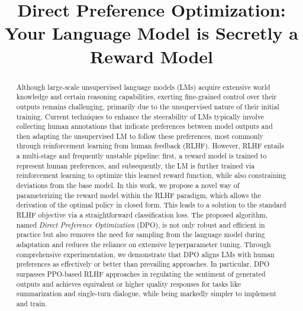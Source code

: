 \title{Direct Preference Optimization: Your Language Model is Secretly a Reward Model}

\begin{abstract}
Although large-scale unsupervised language models (LMs) acquire extensive world knowledge and certain reasoning capabilities, exerting fine-grained control over their outputs remains challenging, primarily due to the unsupervised nature of their initial training. Current techniques to enhance the steerability of LMs typically involve collecting human annotations that indicate preferences between model outputs and then adapting the unsupervised LM to follow these preferences, most commonly through reinforcement learning from human feedback (RLHF). However, RLHF entails a multi-stage and frequently unstable pipeline: first, a reward model is trained to represent human preferences, and subsequently, the LM is further trained via reinforcement learning to optimize this learned reward function, while also constraining deviations from the base model. In this work, we propose a novel way of parameterizing the reward model within the RLHF paradigm, which allows the derivation of the optimal policy in closed form. This leads to a solution to the standard RLHF objective via a straightforward classification loss. The proposed algorithm, named \textit{Direct Preference Optimization} (DPO), is not only robust and efficient in practice but also removes the need for sampling from the language model during adaptation and reduces the reliance on extensive hyperparameter tuning. Through comprehensive experimentation, we demonstrate that DPO aligns LMs with human preferences as effectively or better than prevailing approaches. In particular, DPO surpasses PPO-based RLHF approaches in regulating the sentiment of generated outputs and achieves equivalent or higher quality responses for tasks like summarization and single-turn dialogue, while being markedly simpler to implement and train.
\end{abstract}

